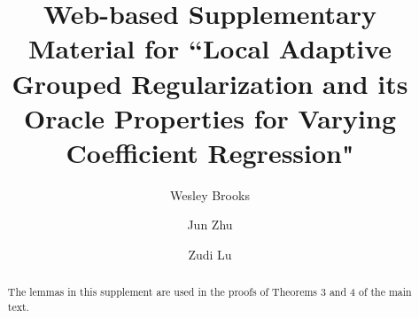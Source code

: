 \documentclass[authoryear,review, 12pt]{elsarticle}
\begin{document}
\begin{frontmatter}

\title{Web-based Supplementary Material for ``Local Adaptive Grouped Regularization and its Oracle Properties for Varying Coefficient Regression"}


\author[wrbrooks]{Wesley Brooks}

\author[jzhu]{Jun Zhu}

\author[zlu]{Zudi Lu}

\address[wrbrooks]{Department of Statistics, University of Wisconsin, Madison, WI 53706}
\address[jzhu]{Department of Statistics and Department of Entomology, University of Wisconsin, Madison, WI 53706}
\address[zlu]{School of Mathematical Sciences, The University of Southampton, Highfield, Southampton UK}

\begin{abstract}
The lemmas in this supplement are used in the proofs of Theorems 3 and 4 of the main text.
\end{abstract}

\begin{keyword}
\end{keyword}


\end{frontmatter}
\end{document}
